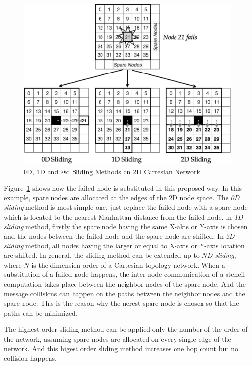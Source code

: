\begin{figure}[ht]
\begin{center}
\includegraphics[width=0.95\columnwidth]{Figs/SlidingSubstitution.pdf}
  \caption{0D, 1D and @d Sliding Methods on 2D Cartesian Network}
  \label{fig:sliding-methods}
\end{center}
\end{figure}

Figure~\ref{fig:sliding-methods} shows how the failed node is
substituted in this proposed way. In this example, spare nodes are
allocated at the edges of the 2D node space. The {\em 0D sliding}
method is most simple one, just replace the failed node with a spare
node which is located to the nearest Manhattan distance from the
failed node. In {\em 1D sliding} method, firstly the spare node having
the same X-akis or Y-axis is chosen and the nodes between the failed
node and the spare node are shifted. In {\em 2D sliding} method, all
nodes having the larger or equal to X-axis or Y-axis location are
shifted. In general, the sliding method can be extended up to {\em
$N$D sliding}, where $N$ is the dimension order of a Cartesian
topology network. When a substitution of a failed node happens, the
inter-node communication of a stencil 
computation takes place between the neighbor nodes of the spare node. 
And the message collisions can happen on the paths between the
neighbor nodes and the spare node.  This is the reason why the nerest
spare node is chosen so that the paths can be minimized. 

The highest order sliding method can be applied only the number of the
order of the network, assuming spare nodes are allocated on every
single edge of the network. And this higest order sliding method
increases one hop count but no collision happens.

